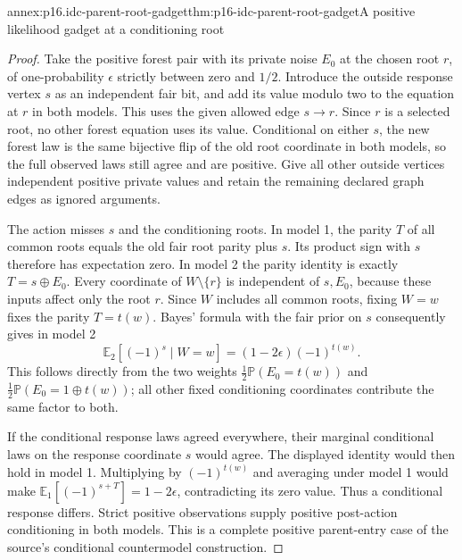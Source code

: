 \begin{annexitem}{annex:p16.idc-parent-root-gadget}{thm:p16-idc-parent-root-gadget}{A positive likelihood gadget at a conditioning root}
\begin{proof}
Take the positive forest pair with its private noise \(E_0\)
at the chosen root \(r\), of one-probability \(\epsilon\)
strictly between zero and \(1/2\). Introduce the outside
response vertex \(s\) as an independent fair bit, and add
its value modulo two to the equation at \(r\) in both models.
This uses the given allowed edge \(s\to r\). Since \(r\)
is a selected root, no other forest equation uses its value.
Conditional on either \(s\), the new forest law is the same
bijective flip of the old root coordinate in both models, so
the full observed laws still agree and are positive. Give all
other outside vertices independent positive private values and
retain the remaining declared graph edges as ignored arguments.

The action misses \(s\) and the conditioning roots. In model 1,
the parity \(T\) of all common roots equals the old fair
root parity plus \(s\). Its product sign with \(s\) therefore
has expectation zero. In model 2 the parity identity is exactly
\(T=s\oplus E_0\). Every coordinate of \(W\setminus\{r\}\)
is independent of \(s,E_0\), because these inputs affect only
the root \(r\). Since \(W\) includes all common roots,
fixing \(W=w\) fixes the parity \(T=t(w)\). Bayes' formula
with the fair prior on \(s\) consequently gives in model 2
\[
 \mathbb E_2[(-1)^s\mid W=w]
       =(1-2\epsilon)(-1)^{t(w)}.
\]
This follows directly from the two weights
\(\frac12\mathbb P(E_0=t(w))\) and
\(\frac12\mathbb P(E_0=1\oplus t(w))\); all other fixed
conditioning coordinates contribute the same factor to both.

If the conditional response laws agreed everywhere, their marginal
conditional laws on the response coordinate \(s\) would agree.
The displayed identity would then hold in model 1. Multiplying
by \((-1)^{t(w)}\) and averaging under model 1 would make
\(\mathbb E_1[(-1)^{s+T}]=1-2\epsilon\), contradicting
its zero value. Thus a conditional response differs. Strict
positive observations supply positive post-action conditioning
in both models. This is a complete positive parent-entry case
of the source's conditional countermodel construction.
\end{proof}
\end{annexitem}

